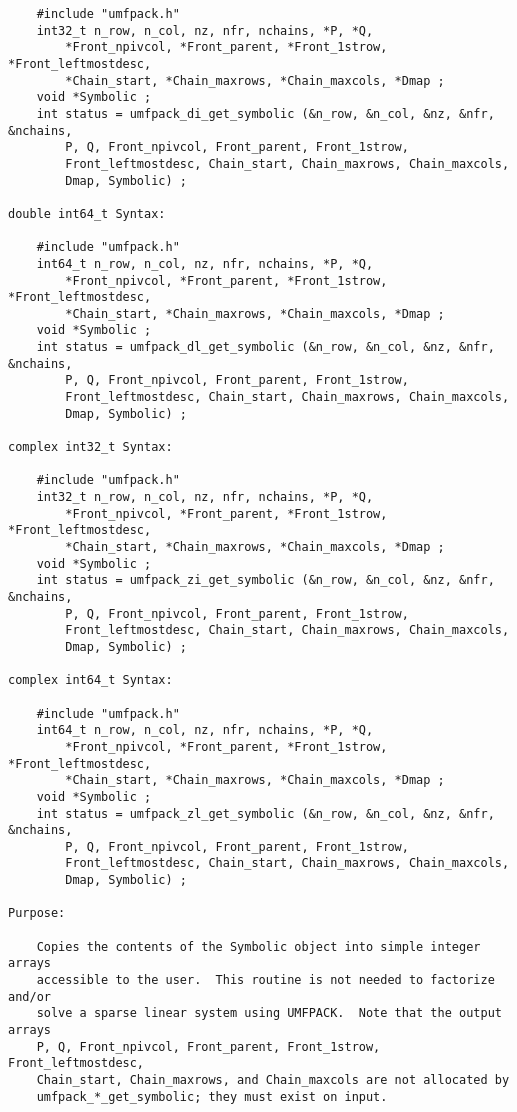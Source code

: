 \documentclass[11pt]{article}
\begin{document}
{\begin{verbatim}
    #include "umfpack.h"
    int32_t n_row, n_col, nz, nfr, nchains, *P, *Q,
        *Front_npivcol, *Front_parent, *Front_1strow, *Front_leftmostdesc,
        *Chain_start, *Chain_maxrows, *Chain_maxcols, *Dmap ;
    void *Symbolic ;
    int status = umfpack_di_get_symbolic (&n_row, &n_col, &nz, &nfr, &nchains,
        P, Q, Front_npivcol, Front_parent, Front_1strow,
        Front_leftmostdesc, Chain_start, Chain_maxrows, Chain_maxcols,
        Dmap, Symbolic) ;

double int64_t Syntax:

    #include "umfpack.h"
    int64_t n_row, n_col, nz, nfr, nchains, *P, *Q,
        *Front_npivcol, *Front_parent, *Front_1strow, *Front_leftmostdesc,
        *Chain_start, *Chain_maxrows, *Chain_maxcols, *Dmap ;
    void *Symbolic ;
    int status = umfpack_dl_get_symbolic (&n_row, &n_col, &nz, &nfr, &nchains,
        P, Q, Front_npivcol, Front_parent, Front_1strow,
        Front_leftmostdesc, Chain_start, Chain_maxrows, Chain_maxcols,
        Dmap, Symbolic) ;

complex int32_t Syntax:

    #include "umfpack.h"
    int32_t n_row, n_col, nz, nfr, nchains, *P, *Q,
        *Front_npivcol, *Front_parent, *Front_1strow, *Front_leftmostdesc,
        *Chain_start, *Chain_maxrows, *Chain_maxcols, *Dmap ;
    void *Symbolic ;
    int status = umfpack_zi_get_symbolic (&n_row, &n_col, &nz, &nfr, &nchains,
        P, Q, Front_npivcol, Front_parent, Front_1strow,
        Front_leftmostdesc, Chain_start, Chain_maxrows, Chain_maxcols,
        Dmap, Symbolic) ;

complex int64_t Syntax:

    #include "umfpack.h"
    int64_t n_row, n_col, nz, nfr, nchains, *P, *Q,
        *Front_npivcol, *Front_parent, *Front_1strow, *Front_leftmostdesc,
        *Chain_start, *Chain_maxrows, *Chain_maxcols, *Dmap ;
    void *Symbolic ;
    int status = umfpack_zl_get_symbolic (&n_row, &n_col, &nz, &nfr, &nchains,
        P, Q, Front_npivcol, Front_parent, Front_1strow,
        Front_leftmostdesc, Chain_start, Chain_maxrows, Chain_maxcols,
        Dmap, Symbolic) ;

Purpose:

    Copies the contents of the Symbolic object into simple integer arrays
    accessible to the user.  This routine is not needed to factorize and/or
    solve a sparse linear system using UMFPACK.  Note that the output arrays
    P, Q, Front_npivcol, Front_parent, Front_1strow, Front_leftmostdesc,
    Chain_start, Chain_maxrows, and Chain_maxcols are not allocated by
    umfpack_*_get_symbolic; they must exist on input.


\end{verbatim}}
\end{document}
